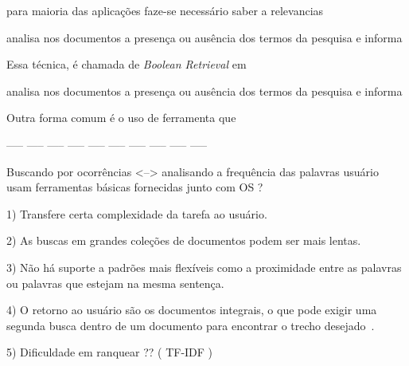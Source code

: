 para maioria das aplicações faze-se necessário saber a relevancias 


analisa nos documentos a presença ou ausência dos termos da pesquisa e informa



Essa técnica, é chamada de \textit{Boolean Retrieval} em 

analisa nos documentos a presença ou ausência dos termos da pesquisa e informa



Outra forma comum é o uso de ferramenta que


----- ----- ----- ----- ----- ----- ----- ----- ----- -----


Buscando por ocorrências <--> analisando a frequência das palavras
usuário usam ferramentas básicas fornecidas junto com OS ?


1) Transfere certa complexidade da tarefa ao usuário.


2) As buscas em grandes coleções de documentos podem ser mais lentas. 

3) Não há suporte a padrões mais flexíveis como a proximidade entre as palavras ou palavras que estejam na mesma sentença.


4) O retorno ao usuário são os documentos integrais, o que pode exigir uma segunda busca dentro de um documento para encontrar o trecho desejado~\cite{Aggarwal2012,Manning2008}. 


5) Dificuldade em ranquear ?? ( TF-IDF )






